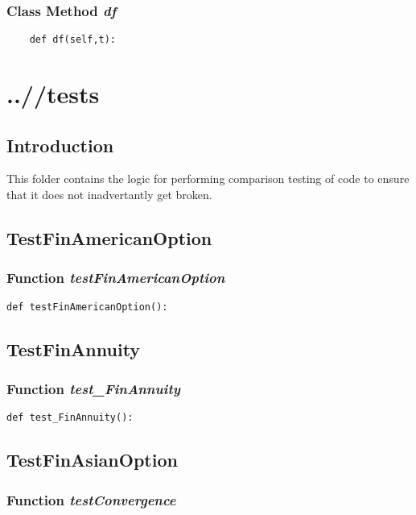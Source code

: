 \documentclass[twoside,11pt]{book}
\begin{document}
\subsection{Class Method {\it df}}


\begin{lstlisting}
    def df(self,t):
\end{lstlisting}


\chapter{..//tests}
\section{Introduction}
This folder contains the logic for performing comparison testing of code to ensure that it does not inadvertantly get broken. 

\newpage
\section{TestFinAmericanOption}

\subsection{Function {\it testFinAmericanOption}}


\begin{lstlisting}
def testFinAmericanOption():
\end{lstlisting}


\newpage
\section{TestFinAnnuity}

\subsection{Function {\it test\_FinAnnuity}}


\begin{lstlisting}
def test_FinAnnuity():
\end{lstlisting}


\newpage
\section{TestFinAsianOption}

\subsection{Function {\it testConvergence}}
\end{document}
